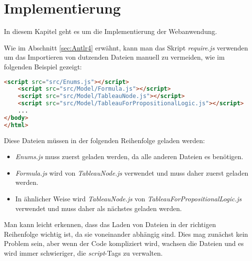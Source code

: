 \chapter{Implementierung}\label{sec:Implementierung}
In diesem Kapitel geht es um die Implementierung der Webanwendung. 

Wie im Abschnitt \ref {sec:Antlr4} erwähnt, kann man das Skript \textit {require.js} verwenden um das Importieren von dutzenden Dateien manuell zu vermeiden, wie im folgenden Beispiel gezeigt:

\begin{lstlisting}[language=HTML,basicstyle=\scriptsize]
    <script src="src/Enums.js"></script>
    <script src="src/Model/Formula.js"></script>
    <script src="src/Model/TableauNode.js"></script>   
    <script src="src/Model/TableauForPropositionalLogic.js"></script>
    ...
</body>
</html>
\end{lstlisting}
Diese Dateien müssen in der folgenden Reihenfolge geladen werden:
\begin{itemize}
\item	\textit{Enums.js} muss zuerst geladen werden, da alle anderen Dateien es benötigen.
\item	\textit{Formula.js} wird von \textit{TableauNode.js} verwendet und muss daher zuerst geladen werden.
\item	In ähnlicher Weise wird \textit{TableauNode.js} von \textit{TableauForPropositionalLogic.js} verwendet und muss daher als nächstes geladen werden.
\end{itemize}
Man kann leicht erkennen, dass das Laden von Dateien in der richtigen Reihenfolge wichtig ist, da sie voneinander abhängig sind. Dies mag zunächst kein Problem sein, aber wenn der Code kompliziert wird, wachsen die Dateien und es wird immer schwieriger, die \textit{script}-Tags zu verwalten.


